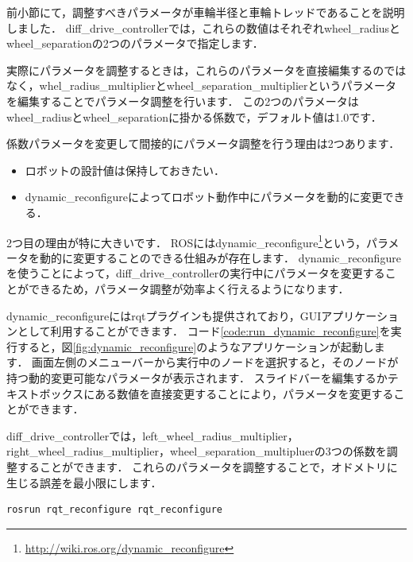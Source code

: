 \documentclass[{../../master}]{subfiles}
\begin{document}
前小節にて，調整すべきパラメータが車輪半径と車輪トレッドであることを説明しました．
\textsf{diff\_drive\_controller}では，これらの数値はそれぞれ\textsf{wheel\_radius}と\textsf{wheel\_separation}の2つのパラメータで指定します．

実際にパラメータを調整するときは，これらのパラメータを直接編集するのではなく，\textsf{whel\_radius\_multiplier}と\textsf{wheel\_separation\_multiplier}というパラメータを編集することでパラメータ調整を行います．
この2つのパラメータは\textsf{wheel\_radius}と\textsf{wheel\_separation}に掛かる係数で，デフォルト値は1.0です．

係数パラメータを変更して間接的にパラメータ調整を行う理由は2つあります．

\begin{itemize}
  \item ロボットの設計値は保持しておきたい．
  \item \textsf{dynamic\_reconfigure}によってロボット動作中にパラメータを動的に変更できる．
\end{itemize}

2つ目の理由が特に大きいです．
ROSには\textsf{dynamic\_reconfigure}\footnote{\url{http://wiki.ros.org/dynamic_reconfigure}}という，パラメータを動的に変更することのできる仕組みが存在します．
\textsf{dynamic\_reconfigure}を使うことによって，\textsf{diff\_drive\_controller}の実行中にパラメータを変更することができるため，パラメータ調整が効率よく行えるようになります．

\textsf{dynamic\_reconfigure}には\textsf{rqt}プラグインも提供されており，GUIアプリケーションとして利用することができます．
コード\ref{code:run_dynamic_reconfigure}を実行すると，図\ref{fig:dynamic_reconfigure}のようなアプリケーションが起動します．
画面左側のメニューバーから実行中のノードを選択すると，そのノードが持つ動的変更可能なパラメータが表示されます．
スライドバーを編集するかテキストボックスにある数値を直接変更することにより，パラメータを変更することができます．

\textsf{diff\_drive\_controller}では，\textsf{left\_wheel\_radius\_multiplier}，\textsf{right\_wheel\_radius\_multiplier}，\textsf{wheel\_separation\_multipluer}の3つの係数を調整することができます．
これらのパラメータを調整することで，オドメトリに生じる誤差を最小限にします．

\begin{lstlisting}[language=sh, label=code:run_dynamic_reconfigure, caption=Run \textsf{dynamic\_reconfigure}]
rosrun rqt_reconfigure rqt_reconfigure
\end{lstlisting}
\end{document}
